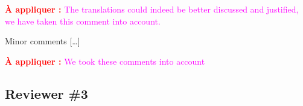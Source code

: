 \documentclass[11pt]{article}
\newcommand{\answertodo}[1]{\textcolor{red}{\textbf{À appliquer :}} \textcolor{magenta}{#1}}
\begin{document}
\answertodo{
The translations could indeed be better discussed and justified,
we have taken this comment into account.
}

Minor comments […]
% 
% 

\answertodo{
We took these comments into account
}



\subsection*{Reviewer \#3}

% 
\end{document}
